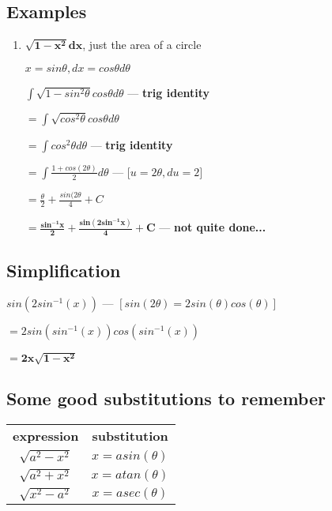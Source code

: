 \documentclass{article}
\begin{document}
\subsection{Examples}
\begin{center}
\begin{enumerate}
    \item $\mathbf{\sqrt{1-x^2}dx}$, just the area of a circle
    
    $x = sin\theta, dx = cos\theta d\theta$
    
    $\int \sqrt{1 - sin^2\theta} cos\theta d\theta$ --- \textbf{trig identity}
    
    $ = \int \sqrt{cos^2\theta} cos\theta d\theta$
    
    $ = \int cos^2\theta d\theta$ --- \textbf{trig identity}
    
    $ = \int \frac{1 + cos(2\theta)}{2} d\theta  $ --- [$u = 2\theta, du = 2]$
    
    $ = \frac{\theta}{2} + \frac{sin(2\theta}{4} + C$
    
    $ \mathbf{= \frac{sin^{-1}x}{2} + \frac {sin(2sin^{-1}x)}{4} + C} $ --- \textbf{not quite done...}
\end{enumerate}
\end{center}
\subsection{Simplification}
\begin{center}
$sin(2sin^{-1}(x))$ --- $ [sin(2\theta) = 2sin(\theta)cos(\theta)]$

$ = 2sin(sin^{-1}(x))cos(sin^{-1}(x))$

$ \mathbf{= 2x \sqrt{1-x^2}}$
\end{center}
\subsection{Some good substitutions to remember}
\begin{center}
\begin{tabular}{ c c }
 \textbf{expression} & \textbf{substitution} \\
 $\sqrt{a^2-x^2}$ & $x = a sin(\theta)$ \\
 $\sqrt{a^2+x^2}$ & $x = a tan(\theta)$ \\
 $\sqrt{x^2-a^2}$ & $x = a sec(\theta)$ \\
\end{tabular}
\end{center}
\end{document}
